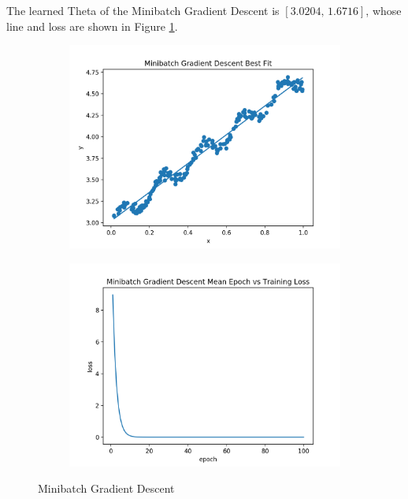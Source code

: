 \documentclass[11pt]{article}
\begin{document}
\begin{enumerate}
The learned Theta of the Minibatch Gradient Descent is $[3.0204,\, 1.6716]$, whose line and loss are shown in Figure \ref{fig:bsgd}.


\begin{figure}[!h]
    \centering
    \begin{subfigure}[b]{0.4\linewidth}
      \includegraphics[width=\linewidth]{figures/bsgd.png}
    \end{subfigure}
    \begin{subfigure}[b]{0.4\linewidth}
      \includegraphics[width=\linewidth]{figures/bsgd_loss.png}
    \end{subfigure}
    \caption{Minibatch Gradient Descent}
    \label{fig:bsgd}
\end{figure}


\end{enumerate}
\end{document}
